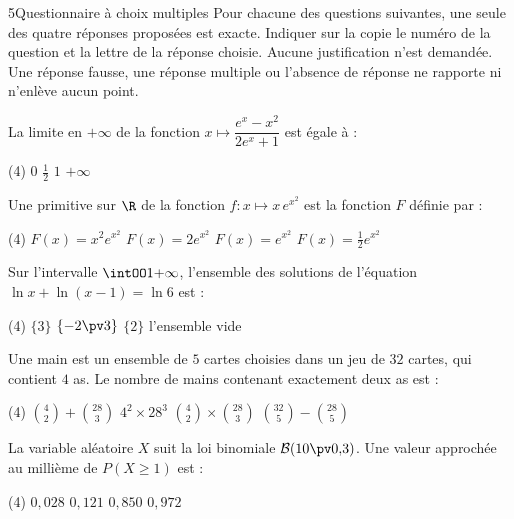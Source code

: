 

\begin{exoBac}{5}{Questionnaire à choix multiples}
Pour chacune des questions suivantes, une seule des quatre réponses proposées est exacte. Indiquer sur la copie le numéro de la
question et la lettre de la réponse choisie. Aucune justification n'est demandée. Une réponse fausse, une réponse multiple ou
l'absence de réponse ne rapporte ni n'enlève aucun point.
\begin{questions}
  \item La limite en $+\infty$ de la fonction $x\mapsto\dfrac{e^{x}-x^{2}}{2e^{x}+1}$ est égale à :
\begin{tasks}[label=\alph*)](4)
  \task $0$
  \task $\frac12$
  \task $1$
  \task $+\infty$
\end{tasks}
  \item Une primitive sur $\R$ de la fonction $f:x\mapsto x\,e^{x^{2}}$ est la fonction $F$ définie par :
\begin{tasks}[label=\alph*)](4)
  \task $F(x)=x^{2}e^{x^{2}}$
  \task $F(x)=2e^{x^{2}}$
  \task $F(x)=e^{x^{2}}$
  \task $F(x)=\frac12e^{x^{2}}$
\end{tasks}
  \item Sur l'intervalle $\intOO1{+\infty}$, l'ensemble des solutions de l'équation $\ln x+\ln(x-1)=\ln6$ est :
\begin{tasks}[label=\alph*)](4)
  \task $\{3\}$
  \task $\{-2\pv3\}$
  \task $\{2\}$
  \task l'ensemble vide
\end{tasks}
  \item Une main est un ensemble de $5$ cartes choisies dans un jeu de $32$ cartes, qui contient $4$ as. Le nombre de mains contenant
    exactement deux as est :
\begin{tasks}[label=\alph*)](4)
  \task $\binom42+\binom{28}{3}$
  \task $4^{2}\times28^{3}$
  \task $\binom42\times\binom{28}{3}$
  \task $\binom{32}{5}-\binom{28}{5}$
\end{tasks}
  \item La variable aléatoire $X$ suit la loi binomiale $\mathcal{B}(10\pv0{,}3)$. Une valeur approchée au millième de $P(X\geq1)$ est :
\begin{tasks}[label=\alph*)](4)
  \task $0{,}028$
  \task $0{,}121$
  \task $0{,}850$
  \task $0{,}972$
\end{tasks}
\end{questions}
\end{exoBac}

